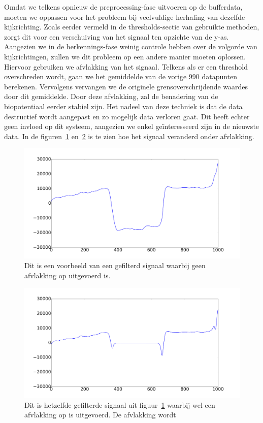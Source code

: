 \documentclass{article}
\begin{document}
Omdat we telkens opnieuw de preprocessing-fase uitvoeren op de bufferdata, moeten we oppassen voor het probleem bij veelvuldige herhaling van dezelfde kijkrichting. Zoals eerder vermeld in de thresholds-sectie van gebruikte methoden, zorgt dit voor een verschuiving van het signaal ten opzichte van de y-as. Aangezien we in de herkennings-fase weinig controle hebben over de volgorde van kijkrichtingen, zullen we dit probleem op een andere manier moeten oplossen. Hiervoor gebruiken we afvlakking van het signaal. Telkens als er een threshold overschreden wordt, gaan we het gemiddelde van de vorige 990 datapunten berekenen. Vervolgens vervangen we de originele grensoverschrijdende waardes door dit gemiddelde. Door deze afvlakking, zal de benadering van de biopotentiaal eerder stabiel zijn. Het nadeel van deze techniek is dat de data destructief wordt aangepast en zo mogelijk data verloren gaat. Dit heeft echter geen invloed op dit systeem, aangezien we enkel geïnteresseerd zijn in de nieuwste data. In de figuren~\ref{fig:afvlakking_original} en~\ref{fig:afvlakking} is te zien hoe het signaal veranderd onder afvlakking.

\begin{figure}[h]
\centering
\includegraphics[width=\linewidth]{images/afvlakking_original}
\caption{Dit is een voorbeeld van een gefilterd signaal waarbij geen afvlakking op uitgevoerd is.}
\label{fig:afvlakking_original}
\end{figure}

\begin{figure}[h]
\centering
\includegraphics[width=\linewidth]{images/afvlakking}
\caption{Dit is hetzelfde gefilterde signaal uit figuur~\ref{fig:afvlakking_original} waarbij wel een afvlakking op is uitgevoerd. De afvlakking wordt }
\label{fig:afvlakking}
\end{figure}
\end{document}
